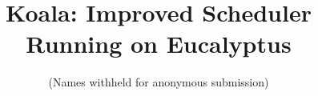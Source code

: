 \documentclass[letterpaper,twocolumn,12pt]{article}
\title{Koala: Improved Scheduler Running on Eucalyptus}
\author{\small (Names withheld for anonymous submission)}
\date{}
\begin{document}
\maketitle









\footnotesize



\normalsize
\clearpage

\end{document}
